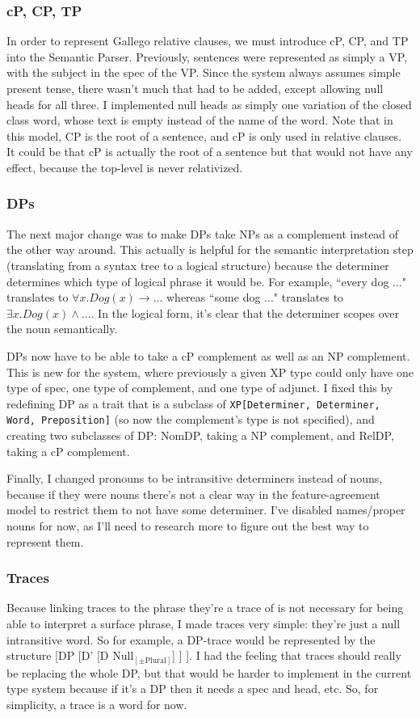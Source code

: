 \documentclass[11pt]{article}
\begin{document}
\subsubsection{cP, CP, TP}
In order to represent Gallego relative clauses, we must introduce cP, CP, and TP into the Semantic
Parser. Previously, sentences were represented as simply a VP, with the subject in the spec of the VP.
Since the system always assumes simple present tense, there
wasn't much that had to be added, except allowing null heads for all three. I implemented null heads
as simply one variation of the closed class word, whose text is empty instead of the name of the word.
Note that in this model, CP is the root of a sentence, and cP is only used in relative clauses. It could
be that cP is actually the root of a sentence but that would not have any effect, because the top-level
is never relativized.

\subsubsection{DPs}
The next major change was to make DPs take NPs as a complement instead of the other way around. This
actually is helpful for the semantic interpretation step (translating from a syntax tree to a logical
structure) because the determiner determines which type of logical phrase it would be. For example,
``every dog ..." translates to $\forall x.Dog(x)\rightarrow ...$ whereas ``some dog ..." translates to
$\exists x.Dog(x) \wedge ... $. In the logical form, it's clear that the determiner scopes over the
noun semantically.

DPs now have to be able to take a cP complement as well as an NP complement. This is new for
the system, where previously a given XP type could only have one type of spec, one type of complement,
and one type of adjunct. I fixed this by redefining DP as a trait that is a subclass of \texttt{XP[Determiner, Determiner, Word, Preposition]} (so now the complement's type is not specified), and creating two
subclasses of DP: NomDP, taking a NP complement, and RelDP, taking a cP complement.

Finally, I changed pronouns to be intransitive determiners instead of nouns, because if they were
nouns there's not a clear way in the feature-agreement model to restrict them to not have some
determiner. I've disabled names/proper nouns for now, as I'll need to research more to figure out
the best way to represent them.

\subsubsection{Traces}
Because linking traces to the phrase they're a trace of is not necessary for being able to interpret
a surface phrase, I made traces very simple: they're just a null intransitive word. So for example,
a DP-trace would be represented by the structure [DP [D' [D Null$_{[\pm \text{Plural}]}$] ] ]. I
had the feeling that traces should really be replacing the whole DP, but that would be harder to
implement in the current type system because if it's a DP then it needs a spec and head, etc. So,
for simplicity, a trace is a word for now.
\end{document}
